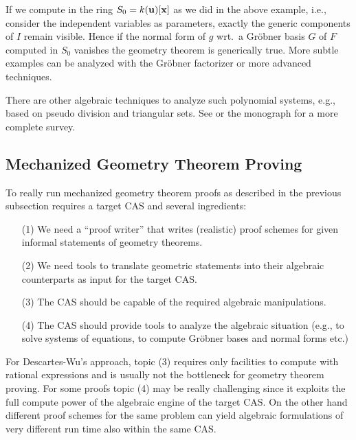 \documentclass[11pt]{article}
\begin{document}
If we compute in the ring $S_0 = k({\bf u})[{\bf x}]$ as we did in the above
example, i.e., consider the independent variables as parameters, exactly the
generic components of $I$ remain visible.  Hence if the normal form of $g$
wrt.\ a Gr\"obner basis $G$ of $F$ computed in $S_0$ vanishes the geometry
theorem is generically true.  More subtle examples can be analyzed with the
Gr\"obner factorizer or more advanced techniques.

There are other algebraic techniques to analyze such polynomial systems, e.g.,
based on pseudo division and triangular sets. See \cite{Kapur_97a} or the
monograph \cite{Books/Wang_01a} for a more complete survey.

\subsection{Mechanized Geometry Theorem Proving}

To really run mechanized geometry theorem proofs as described in the previous
subsection requires a target CAS and several ingredients:
\begin{itemize}\itemsep0pt
\item[(1)] We need a ``proof writer'' that writes (realistic) proof schemes
  for given informal statements of geometry theorems.
\item[(2)] We need tools to translate geometric statements into their
  algebraic counterparts as input for the target CAS.
\item[(3)] The CAS should be capable of the required algebraic manipulations.
\item[(4)] The CAS should provide tools to analyze the algebraic situation
  (e.g., to solve systems of equations, to compute Gr\"obner bases and normal
  forms etc.)
\end{itemize}

For Descartes-Wu's approach, topic (3) requires only facilities to compute
with rational expressions and is usually not the bottleneck for geometry
theorem proving.  For some proofs topic (4) may be really challenging since it
exploits the full compute power of the algebraic engine of the target CAS.
On the other hand different proof schemes for the same problem can yield
algebraic formulations of very different run time also within the same CAS.
\end{document}
